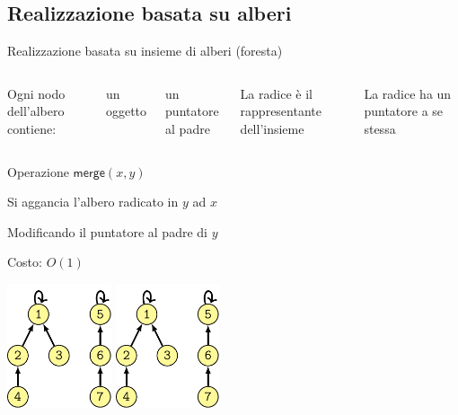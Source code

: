 \subsection{Realizzazione basata su alberi}

\begin{frame}{Realizzazione basata su insieme di alberi (foresta)}

\vspace{-9pt}

\begin{columns}[T]
\BIL
\item Ogni nodo dell'albero contiene:
  \BI
  \item un oggetto
  \item un puntatore al padre
  \EI
\item La radice è il rappresentante dell'insieme
\item La radice ha un puntatore a se stessa
\EIL
{}
\end{columns}

\end{frame}



\begin{frame}{Operazione $\textsf{merge}(x,y)$}

\vspace{-9pt}
\BIL
\item Si aggancia l'albero radicato in $y$ ad $x$
\item Modificando il puntatore al padre di $y$
\item Costo: $O(1)$
\EIL

\bigskip\centering
\includegraphics[width=0.23\textwidth,page=1,valign=t]{mfset-alberi.pdf}
\qquad{\huge $\Rightarrow$}\quad
\includegraphics[width=0.23\textwidth,page=2,valign=t]{mfset-alberi.pdf}




\end{frame}

